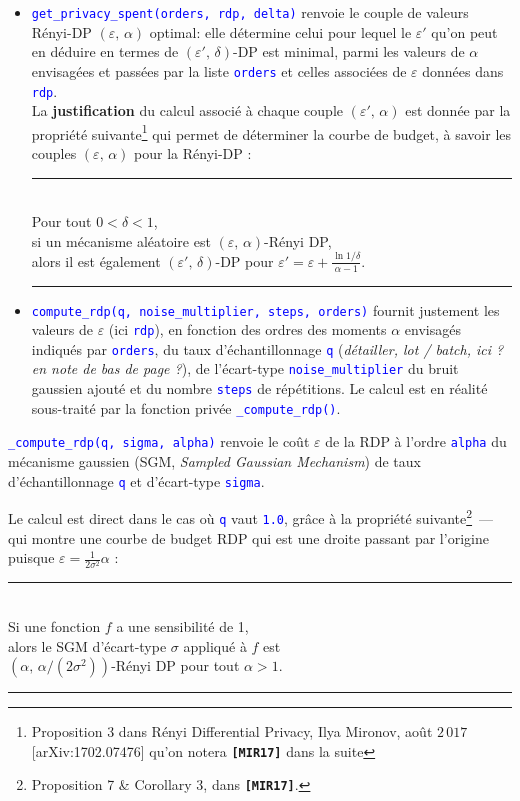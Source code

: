 \documentclass[a4paper,11pt]{article} %
\newcommand{\ttt}[1]{\texttt{#1}}
\newcommand{\code}[1]{\textcolor{blue}{\texttt{#1}}}
\newcommand{\prop}[1]{\begin{center}\smallskip\rule{0.95\linewidth}{0.5pt}\nopagebreak\\
                      \textsf{#1}\nopagebreak\\
                      \rule{0.95\linewidth}{0.5pt}\smallskip\end{center}}
\begin{document}
\begin{itemize}
    \item 
    \code{get\_privacy\_spent(orders, rdp, delta)} renvoie le couple de valeurs Rényi-DP $(\varepsilon,\,\alpha)$ optimal: elle détermine celui pour lequel le $\varepsilon'$ qu'on peut en déduire en termes de $(\varepsilon',\,\delta)$-DP est minimal, parmi les valeurs de $\alpha$ envisagées et passées par la liste \code{orders} et celles associées de $\varepsilon$ données dans \code{rdp}.\\
    La \textbf{justification} du calcul associé à chaque couple $(\varepsilon',\,\alpha)$ est donnée par la propriété suivante\footnote{\textsf{Proposition 3} dans \og Rényi Differential Privacy\fg{}, Ilya Mironov, août $2\,017$ [arXiv:1702.07476] qu'on notera \textbf{\ttt{[MIR17]}} dans la suite} qui permet de déterminer la \og courbe de budget\fg{}, à savoir les couples $(\varepsilon,\,\alpha)$ pour la Rényi-DP :
    \prop{Pour tout $0<\delta<1$,\\
        si un mécanisme aléatoire est $(\varepsilon,\,\alpha)$-Rényi DP,\\
        alors il est également $(\varepsilon',\, \delta)$-DP pour $\varepsilon'=\varepsilon+\frac{\ln 1/\delta}{\alpha-1}$.}
    \item 
    \code{compute\_rdp(q, noise\_multiplier, steps, orders)} fournit justement les valeurs de $\varepsilon$ (ici \code{rdp}), en fonction des ordres des moments $\alpha$ envisagés indiqués par \code{orders}, du taux d'échantillonnage \code{q} (\emph{détailler, lot / batch, ici ? en note de bas de page ?}), de l'écart-type \code{noise\_multiplier} du bruit gaussien ajouté et du nombre \code{steps} de répétitions. Le calcul est en réalité sous-traité par la fonction \og privée\fg{} \code{\_compute\_rdp()}.
\end{itemize}
\code{\_compute\_rdp(q, sigma, alpha)} renvoie le coût $\varepsilon$ de la RDP à l'ordre \code{alpha} du mécanisme gaussien (SGM, \emph{Sampled Gaussian Mechanism}) de taux d'échantillonnage \code{q} et d'écart-type \code{sigma}.

Le calcul est direct dans le cas où \code{q} vaut \code{1.0}, grâce à la propriété suivante\footnote{\textsf{Proposition 7} \& \textsf{Corollary 3}, dans \textbf{\ttt{[MIR17]}}.}~--- qui montre une \og courbe de budget RDP\fg{} qui est une droite passant par l'origine puisque $\varepsilon = \frac{1}{2\sigma^2}\alpha$ :
\prop{Si une fonction $f$ a une sensibilité de 1,\\
      alors le SGM d'écart-type $\sigma$ appliqué à $f$ est\\
      $(\alpha,\, \alpha/(2\sigma^2))$-Rényi DP pour tout $\alpha>1$.}
\end{document}
